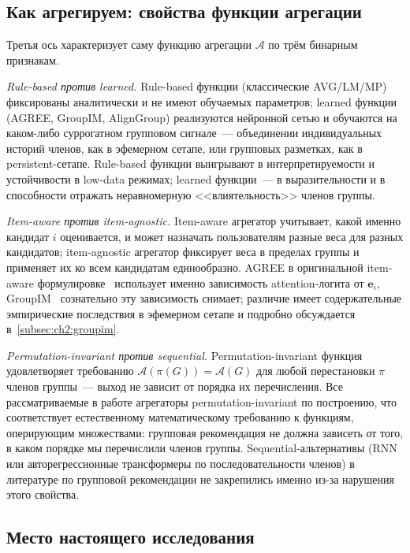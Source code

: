 \subsection{Как агрегируем: свойства функции агрегации}
\label{subsec:ch2:tax-how}

Третья ось характеризует саму функцию агрегации $\mathcal{A}$ по трём бинарным признакам.

\emph{Rule-based против learned.} Rule-based функции (классические AVG/LM/MP) фиксированы аналитически и не имеют обучаемых параметров; learned функции (AGREE, GroupIM, AlignGroup) реализуются нейронной сетью и обучаются на каком-либо суррогатном групповом сигнале~--- объединении индивидуальных историй членов, как в эфемерном сетапе, или групповых разметках, как в persistent-сетапе. Rule-based функции выигрывают в интерпретируемости и устойчивости в low-data режимах; learned функции~--- в выразительности и в способности отражать неравномерную <<влиятельность>> членов группы.

\emph{Item-aware против item-agnostic.} Item-aware агрегатор учитывает, какой именно кандидат $i$ оценивается, и может назначать пользователям разные веса для разных кандидатов; item-agnostic агрегатор фиксирует веса в пределах группы и применяет их ко всем кандидатам единообразно. AGREE в оригинальной item-aware формулировке~\cite{cao2018agree} использует именно зависимость attention-логита от $\mathbf{e}_i$, GroupIM~\cite{sankar2020groupim} сознательно эту зависимость снимает; различие имеет содержательные эмпирические последствия в эфемерном сетапе и подробно обсуждается в~\ref{subsec:ch2:groupim}.

\emph{Permutation-invariant против sequential.} Permutation-invariant функция удовлетворяет требованию $\mathcal{A}(\pi(G)) = \mathcal{A}(G)$ для любой перестановки $\pi$ членов группы~--- выход не зависит от порядка их перечисления. Все рассматриваемые в работе агрегаторы permutation-invariant по построению, что соответствует естественному математическому требованию к функциям, оперирующим множествами: групповая рекомендация не должна зависеть от того, в каком порядке мы перечислили членов группы. Sequential-альтернативы (RNN или авторегрессионные трансформеры по последовательности членов) в литературе по групповой рекомендации не закрепились именно из-за нарушения этого свойства.

\subsection{Место настоящего исследования}
\label{subsec:ch2:tax-place}

